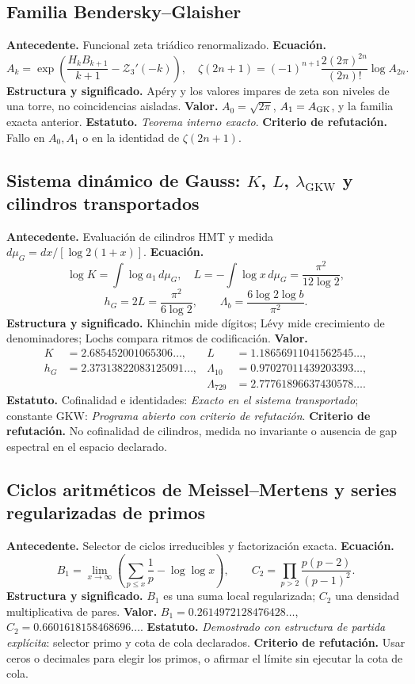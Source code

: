 \subsection*{Familia Bendersky--Glaisher }
\textbf{Antecedente.} Funcional zeta tri\'adico renormalizado.
\textbf{Ecuaci\'on.}
\[
A_k=\exp\!\left(\frac{H_kB_{k+1}}{k+1}-\mathcal Z_3'(-k)\right),
\quad
\zeta(2n+1)=(-1)^{n+1}\frac{2(2\pi)^{2n}}{(2n)!}\log A_{2n}.
\]
\textbf{Estructura y significado.} Ap\'ery y los valores impares de zeta son
niveles de una torre, no coincidencias aisladas. \textbf{Valor.}
\(A_0=\sqrt{2\pi}\), \(A_1=A_{\rm GK}\), y la familia exacta anterior.
\textbf{Estatuto.} \emph{Teorema interno exacto}. \textbf{Criterio de refutación.} Fallo en
\(A_0,A_1\) o en la identidad de \(\zeta(2n+1)\).

\subsection*{Sistema dinámico de Gauss: \(K\), \(L\), \(\lambda_{\mathrm{GKW}}\) y cilindros transportados}
\textbf{Antecedente.} Evaluaci\'on de cilindros HMT y medida
\(d\mu_G=dx/[\log2(1+x)]\). \textbf{Ecuaci\'on.}
\[
\log K=\int\log a_1\,d\mu_G,\quad
L=-\int\log x\,d\mu_G=\frac{\pi^2}{12\log2},
\]
\[
h_G=2L=\frac{\pi^2}{6\log2},\qquad
\Lambda_b=\frac{6\log2\log b}{\pi^2}.
\]
\textbf{Estructura y significado.} Khinchin mide d\'igitos; L\'evy mide
crecimiento de denominadores; Lochs compara ritmos de codificaci\'on.
\textbf{Valor.}
\begin{align*}
K&=2.685452001065306\ldots,
&L&=1.18656911041562545\ldots,\\
h_G&=2.37313822083125091\ldots,
&\Lambda_{10}&=0.97027011439203393\ldots,\\
&&\Lambda_{729}&=2.77761896637430578\ldots.
\end{align*}
\textbf{Estatuto.} Cofinalidad e identidades: \emph{Exacto en el sistema
transportado}; constante GKW: \emph{Programa abierto con criterio de refutación}.
\textbf{Criterio de refutación.} No cofinalidad de cilindros, medida no invariante o ausencia
de gap espectral en el espacio declarado.

\subsection*{Ciclos aritméticos de Meissel--Mertens y series regularizadas de primos}
\textbf{Antecedente.} Selector de ciclos irreducibles y factorizaci\'on
exacta. \textbf{Ecuaci\'on.}
\[
B_1=\lim_{x\to\infty}\left(\sum_{p\le x}\frac1p-\log\log x\right),
\qquad
C_2=\prod_{p>2}\frac{p(p-2)}{(p-1)^2}.
\]
\textbf{Estructura y significado.} \(B_1\) es una suma local regularizada;
\(C_2\) una densidad multiplicativa de pares. \textbf{Valor.}
\(B_1=0.2614972128476428\ldots\),
\(C_2=0.6601618158468696\ldots\). \textbf{Estatuto.}
\emph{Demostrado con estructura de partida expl\'icita}: selector primo y
cota de cola declarados. \textbf{Criterio de refutación.} Usar ceros o decimales para elegir
los primos, o afirmar el l\'imite sin ejecutar la cota de cola.

